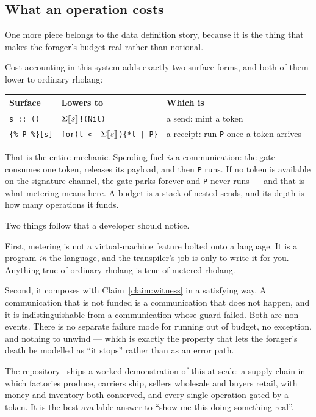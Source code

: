 \subsection{What an operation costs}
\label{sec:cost}

One more piece belongs to the data definition story, because it is the thing
that makes the forager's budget real rather than notional.

Cost accounting in this system adds exactly two surface forms, and both of them
lower to ordinary rholang:

\begin{center}
\small
\begin{tabular}{@{}lll@{}}
\toprule
\textbf{Surface} & \textbf{Lowers to} & \textbf{Which is} \\
\midrule
\texttt{s :: ()} & \texttt{$\Sigma\llbracket s \rrbracket$!(Nil)} & a send: mint a token \\
\texttt{\{\% P \%\}[s]} & \texttt{for(t <- $\Sigma\llbracket s \rrbracket$)\{*t | P\}} & a receipt: run \texttt{P} once a token arrives \\
\bottomrule
\end{tabular}
\end{center}

That is the entire mechanic. Spending fuel \emph{is} a communication: the gate
consumes one token, releases its payload, and then \texttt{P} runs. If no token
is available on the signature channel, the gate parks forever and \texttt{P}
never runs --- and that is what metering means here. A budget is a stack of
nested sends, and its depth is how many operations it funds.

Two things follow that a developer should notice.

First, metering is not a virtual-machine feature bolted onto a language. It is a
program \emph{in} the language, and the transpiler's job is only to write it for
you. Anything true of ordinary rholang is true of metered rholang.

Second, it composes with Claim~\ref{claim:witness} in a satisfying way. A
communication that is not funded is a communication that does not happen, and it
is indistinguishable from a communication whose guard failed. Both are
non-events. There is no separate failure mode for running out of budget, no
exception, and nothing to unwind --- which is exactly the property that lets the
forager's death be modelled as ``it stops'' rather than as an error path.

The repository~\cite{f1r3node} ships a worked demonstration of this at scale: a supply chain in
which factories produce, carriers ship, sellers wholesale and buyers retail,
with money and inventory both conserved, and every single operation gated by a
token. It is the best available answer to ``show me this doing something real''.

